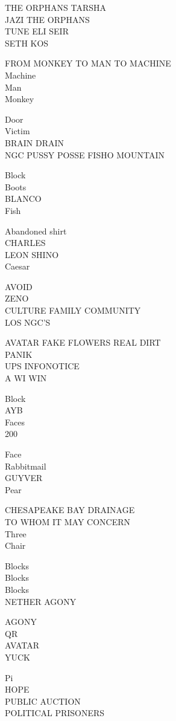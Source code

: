 \documentclass[10pt,letterpaper]{article}
\begin{document}
THE ORPHANS TARSHA\\
JAZI THE ORPHANS\\
TUNE ELI SEIR\\
SETH KOS

FROM MONKEY TO MAN TO MACHINE\\
Machine\\
Man\\
Monkey

Door\\
Victim\\
BRAIN DRAIN\\
NGC PUSSY POSSE FISHO MOUNTAIN

Block\\
Boots\\
BLANCO\\
Fish

Abandoned shirt\\
CHARLES\\
LEON SHINO\\
Caesar

AVOID\\
ZENO\\
CULTURE FAMILY COMMUNITY\\
LOS NGC'S

AVATAR FAKE FLOWERS REAL DIRT\\
PANIK\\
UPS INFONOTICE\\
A WI WIN

Block\\
AYB\\
Faces\\
200

Face\\
Rabbitmail\\
GUYVER\\
Pear

CHESAPEAKE BAY DRAINAGE\\
TO WHOM IT MAY CONCERN\\
Three\\
Chair

Blocks\\
Blocks\\
Blocks\\
NETHER AGONY

AGONY\\
QR\\
AVATAR\\
YUCK

Pi\\
HOPE\\
PUBLIC AUCTION\\
POLITICAL PRISONERS
\end{document}
